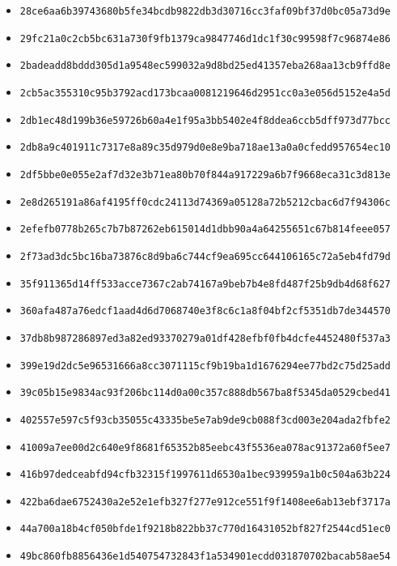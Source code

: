 {\begin{itemize}
    \item \texttt{28ce6aa6b39743680b5fe34bcdb9822db3d30716cc3faf09bf37d0bc05a73d9e}
    \item \texttt{29fc21a0c2cb5bc631a730f9fb1379ca9847746d1dc1f30c99598f7c96874e86}
    \item \texttt{2badeadd8bddd305d1a9548ec599032a9d8bd25ed41357eba268aa13cb9ffd8e}
    \item \texttt{2cb5ac355310c95b3792acd173bcaa0081219646d2951cc0a3e056d5152e4a5d}
    \item \texttt{2db1ec48d199b36e59726b60a4e1f95a3bb5402e4f8ddea6ccb5dff973d77bcc}
    \item \texttt{2db8a9c401911c7317e8a89c35d979d0e8e9ba718ae13a0a0cfedd957654ec10}
    \item \texttt{2df5bbe0e055e2af7d32e3b71ea80b70f844a917229a6b7f9668eca31c3d813e}
    \item \texttt{2e8d265191a86af4195ff0cdc24113d74369a05128a72b5212cbac6d7f94306c}
    \item \texttt{2efefb0778b265c7b7b87262eb615014d1dbb90a4a64255651c67b814feee057}
    \item \texttt{2f73ad3dc5bc16ba73876c8d9ba6c744cf9ea695cc644106165c72a5eb4fd79d}
    \item \texttt{35f911365d14ff533acce7367c2ab74167a9beb7b4e8fd487f25b9db4d68f627}
    \item \texttt{360afa487a76edcf1aad4d6d7068740e3f8c6c1a8f04bf2cf5351db7de344570}
    \item \texttt{37db8b987286897ed3a82ed93370279a01df428efbf0fb4dcfe4452480f537a3}
    \item \texttt{399e19d2dc5e96531666a8cc3071115cf9b19ba1d1676294ee77bd2c75d25add}
    \item \texttt{39c05b15e9834ac93f206bc114d0a00c357c888db567ba8f5345da0529cbed41}
    \item \texttt{402557e597c5f93cb35055c43335be5e7ab9de9cb088f3cd003e204ada2fbfe2}
    \item \texttt{41009a7ee00d2c640e9f8681f65352b85eebc43f5536ea078ac91372a60f5ee7}
    \item \texttt{416b97dedceabfd94cfb32315f1997611d6530a1bec939959a1b0c504a63b224}
    \item \texttt{422ba6dae6752430a2e52e1efb327f277e912ce551f9f1408ee6ab13ebf3717a}
    \item \texttt{44a700a18b4cf050bfde1f9218b822bb37c770d16431052bf827f2544cd51ec0}
    \item \texttt{49bc860fb8856436e1d540754732843f1a534901ecdd031870702bacab58ae54}

\end{itemize}}

